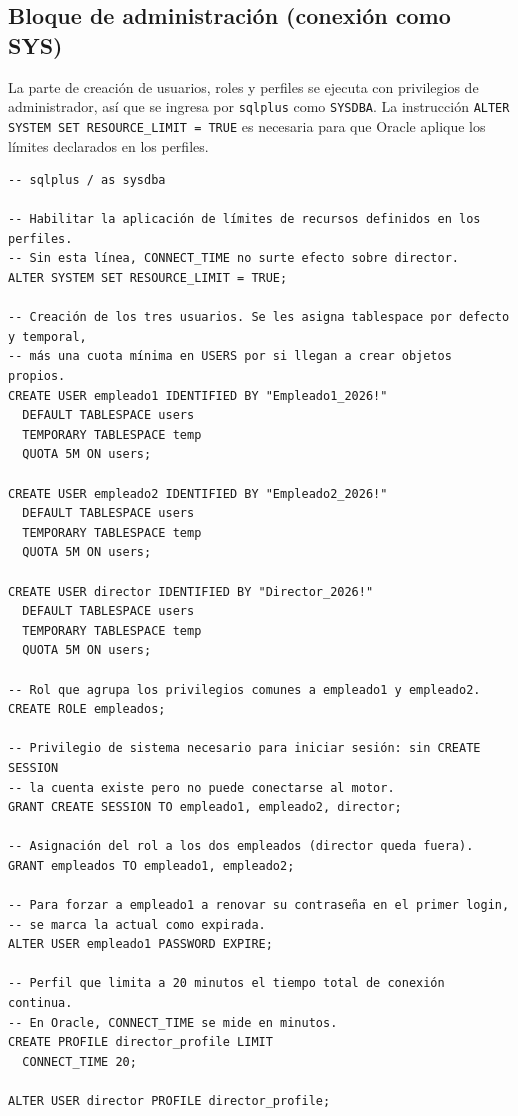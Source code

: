 \documentclass[11pt,a4paper]{article}
\begin{document}
\subsection{Bloque de administración (conexión como SYS)}

La parte de creación de usuarios, roles y perfiles se ejecuta con privilegios de administrador, así que se ingresa por \texttt{sqlplus} como \texttt{SYSDBA}. La instrucción \texttt{ALTER SYSTEM SET RESOURCE\_LIMIT = TRUE} es necesaria para que Oracle aplique los límites declarados en los perfiles.

\begin{lstlisting}
-- sqlplus / as sysdba

-- Habilitar la aplicación de límites de recursos definidos en los perfiles.
-- Sin esta línea, CONNECT_TIME no surte efecto sobre director.
ALTER SYSTEM SET RESOURCE_LIMIT = TRUE;

-- Creación de los tres usuarios. Se les asigna tablespace por defecto y temporal,
-- más una cuota mínima en USERS por si llegan a crear objetos propios.
CREATE USER empleado1 IDENTIFIED BY "Empleado1_2026!"
  DEFAULT TABLESPACE users
  TEMPORARY TABLESPACE temp
  QUOTA 5M ON users;

CREATE USER empleado2 IDENTIFIED BY "Empleado2_2026!"
  DEFAULT TABLESPACE users
  TEMPORARY TABLESPACE temp
  QUOTA 5M ON users;

CREATE USER director IDENTIFIED BY "Director_2026!"
  DEFAULT TABLESPACE users
  TEMPORARY TABLESPACE temp
  QUOTA 5M ON users;

-- Rol que agrupa los privilegios comunes a empleado1 y empleado2.
CREATE ROLE empleados;

-- Privilegio de sistema necesario para iniciar sesión: sin CREATE SESSION
-- la cuenta existe pero no puede conectarse al motor.
GRANT CREATE SESSION TO empleado1, empleado2, director;

-- Asignación del rol a los dos empleados (director queda fuera).
GRANT empleados TO empleado1, empleado2;

-- Para forzar a empleado1 a renovar su contraseña en el primer login,
-- se marca la actual como expirada.
ALTER USER empleado1 PASSWORD EXPIRE;

-- Perfil que limita a 20 minutos el tiempo total de conexión continua.
-- En Oracle, CONNECT_TIME se mide en minutos.
CREATE PROFILE director_profile LIMIT
  CONNECT_TIME 20;

ALTER USER director PROFILE director_profile;
\end{lstlisting}
\end{document}
